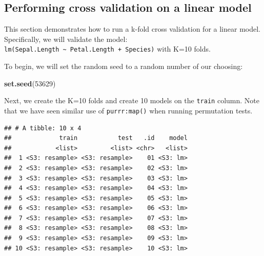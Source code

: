 \documentclass[]{article}
\newenvironment{Shaded}{\begin{snugshade}}{\end{snugshade}}
\newcommand{\KeywordTok}[1]{\textcolor[rgb]{0.13,0.29,0.53}{\textbf{#1}}}
\newcommand{\DataTypeTok}[1]{\textcolor[rgb]{0.13,0.29,0.53}{#1}}
\newcommand{\DecValTok}[1]{\textcolor[rgb]{0.00,0.00,0.81}{#1}}
\newcommand{\StringTok}[1]{\textcolor[rgb]{0.31,0.60,0.02}{#1}}
\newcommand{\OperatorTok}[1]{\textcolor[rgb]{0.81,0.36,0.00}{\textbf{#1}}}
\newcommand{\NormalTok}[1]{#1}
\begin{document}
\subsection{Performing cross validation on a linear
model}\label{performing-cross-validation-on-a-linear-model}

This section demonstrates how to run a k-fold cross validation for a
linear model. Specifically, we will validate the model:
\texttt{lm(Sepal.Length\ \textasciitilde{}\ Petal.Length\ +\ Species)}
with K=10 folds.

To begin, we will set the random seed to a random number of our
choosing:

\begin{Shaded}
\begin{Highlighting}[]
\KeywordTok{set.seed}\NormalTok{(}\DecValTok{53629}\NormalTok{)}
\end{Highlighting}
\end{Shaded}

Next, we create the K=10 folds and create 10 models on the
\texttt{train} column. Note that we have seen similar use of
\texttt{purrr:map()} when running permutation tests.

\begin{Shaded}
\end{Shaded}

\begin{verbatim}
## # A tibble: 10 x 4
##             train           test   .id    model
##            <list>         <list> <chr>   <list>
##  1 <S3: resample> <S3: resample>    01 <S3: lm>
##  2 <S3: resample> <S3: resample>    02 <S3: lm>
##  3 <S3: resample> <S3: resample>    03 <S3: lm>
##  4 <S3: resample> <S3: resample>    04 <S3: lm>
##  5 <S3: resample> <S3: resample>    05 <S3: lm>
##  6 <S3: resample> <S3: resample>    06 <S3: lm>
##  7 <S3: resample> <S3: resample>    07 <S3: lm>
##  8 <S3: resample> <S3: resample>    08 <S3: lm>
##  9 <S3: resample> <S3: resample>    09 <S3: lm>
## 10 <S3: resample> <S3: resample>    10 <S3: lm>
\end{verbatim}
\end{document}
